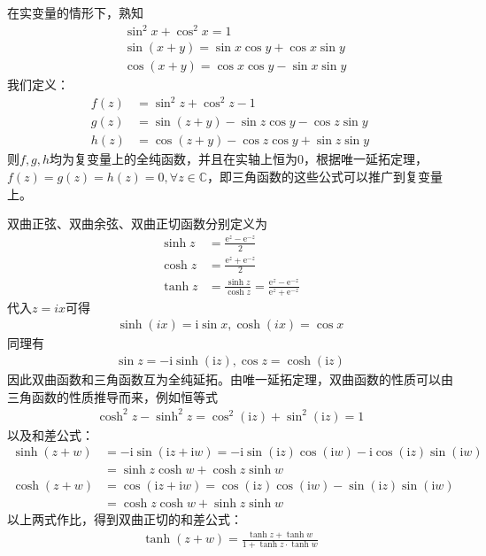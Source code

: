 \documentclass{ctexbook}
\begin{document}
\begin{example}[三角函数]
    在实变量的情形下，熟知\begin{align*}
        &\sin^2 x+\cos^2 x=1\\
        &\sin(x+y)=\sin x\cos y+\cos x\sin y\\
        &\cos(x+y)=\cos x\cos y-\sin x\sin y
    \end{align*}
    我们定义：\begin{align*}
        f(z)&=\sin^2 z+\cos^2 z-1\\
        g(z)&=\sin(z+y)-\sin z\cos y-\cos z\sin y\\
        h(z)&=\cos(z+y)-\cos z\cos y+\sin z\sin y
    \end{align*}
    则$f,g,h$均为复变量上的全纯函数，并且在实轴上恒为0，根据唯一延拓定理，$f(z)=g(z)=h(z)=0,\forall z\in\mathbb{C}$，即三角函数的这些公式可以推广到复变量上。
\end{example}
\begin{example}[双曲函数]
    双曲正弦、双曲余弦、双曲正切函数分别定义为
    \begin{align*}
        \sinh z&=\frac{\mathrm{e}^z-\mathrm{e}^{-z}}{2}\\
        \cosh z&=\frac{\mathrm{e}^z+\mathrm{e}^{-z}}{2}\\
        \tanh z&=\frac{\sinh z}{\cosh z}=\frac{\mathrm{e}^z-\mathrm{e}^{-z}}{\mathrm{e}^z+\mathrm{e}^{-z}}
    \end{align*}
    代入$z=ix$可得
    \begin{align*}
        \sinh (ix)=\mathrm{i}\sin x,\cosh (ix)=\cos x
    \end{align*}
    同理有\begin{align*}
        \sin z=-\mathrm{i}\sinh (\mathrm{i}z),\cos z=\cosh (\mathrm{i}z)
    \end{align*}
    因此双曲函数和三角函数互为全纯延拓。由唯一延拓定理，双曲函数的性质可以由三角函数的性质推导而来，例如恒等式
    \begin{align*}
        \cosh^2 z-\sinh^2 z=\cos^2 (\mathrm{i}z)+\sin^2 (\mathrm{i}z)=1
    \end{align*}
    以及和差公式：
    \begin{align*}
        \sinh(z+w)&=-\mathrm{i}\sin(\mathrm{i}z+\mathrm{i}w)=-\mathrm{i}\sin(\mathrm{i}z)\cos(\mathrm{i}w)-\mathrm{i}\cos(\mathrm{i}z)\sin(\mathrm{i}w)\\
        &=\sinh z\cosh w+\cosh z\sinh w\\
        \cosh(z+w)&=\cos(\mathrm{i}z+\mathrm{i}w)=\cos(\mathrm{i}z)\cos(\mathrm{i}w)-\sin(\mathrm{i}z)\sin(\mathrm{i}w)\\
        &=\cosh z\cosh w+\sinh z\sinh w
    \end{align*}
    以上两式作比，得到双曲正切的和差公式：
    \begin{align*}
        \tanh(z+w)=\frac{\tanh z+\tanh w}{1+\tanh z\cdot\tanh w}
    \end{align*}
\end{example}
\end{document}
